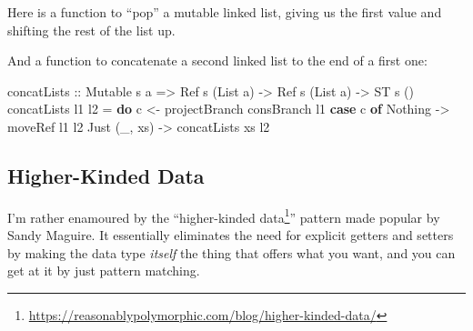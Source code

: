 \documentclass[]{article}
\newenvironment{Shaded}{}{}
\newcommand{\DataTypeTok}[1]{\textcolor[rgb]{0.56,0.13,0.00}{#1}}
\newcommand{\FunctionTok}[1]{\textcolor[rgb]{0.02,0.16,0.49}{#1}}
\newcommand{\KeywordTok}[1]{\textcolor[rgb]{0.00,0.44,0.13}{\textbf{#1}}}
\newcommand{\NormalTok}[1]{#1}
\newcommand{\OperatorTok}[1]{\textcolor[rgb]{0.40,0.40,0.40}{#1}}
\newcommand{\OtherTok}[1]{\textcolor[rgb]{0.00,0.44,0.13}{#1}}
\renewcommand{\href}[2]{#2\footnote{\url{#1}}}
\begin{document}
Here is a function to ``pop'' a mutable linked list, giving us the first value
and shifting the rest of the list up.

\begin{Shaded}
\end{Shaded}

And a function to concatenate a second linked list to the end of a first one:

\begin{Shaded}
\begin{Highlighting}[]
\NormalTok{concatLists}
\OtherTok{    ::} \DataTypeTok{Mutable}\NormalTok{ s a}
    \OtherTok{=>} \DataTypeTok{Ref}\NormalTok{ s (}\DataTypeTok{List}\NormalTok{ a)}
    \OtherTok{{-}>} \DataTypeTok{Ref}\NormalTok{ s (}\DataTypeTok{List}\NormalTok{ a)}
    \OtherTok{{-}>} \DataTypeTok{ST}\NormalTok{ s ()}
\NormalTok{concatLists l1 l2 }\OtherTok{=} \KeywordTok{do}
\NormalTok{    c }\OtherTok{<{-}}\NormalTok{ projectBranch consBranch l1}
    \KeywordTok{case}\NormalTok{ c }\KeywordTok{of}
      \DataTypeTok{Nothing}      \OtherTok{{-}>}\NormalTok{ moveRef l1 l2}
      \DataTypeTok{Just}\NormalTok{ (\_, xs) }\OtherTok{{-}>}\NormalTok{ concatLists xs l2}
\end{Highlighting}
\end{Shaded}

\hypertarget{higher-kinded-data}{%
\subsection{Higher-Kinded Data}\label{higher-kinded-data}}

I'm rather enamoured by the
``\href{https://reasonablypolymorphic.com/blog/higher-kinded-data/}{higher-kinded
data}'' pattern made popular by Sandy Maguire. It essentially eliminates the
need for explicit getters and setters by making the data type \emph{itself} the
thing that offers what you want, and you can get at it by just pattern matching.
\end{document}
